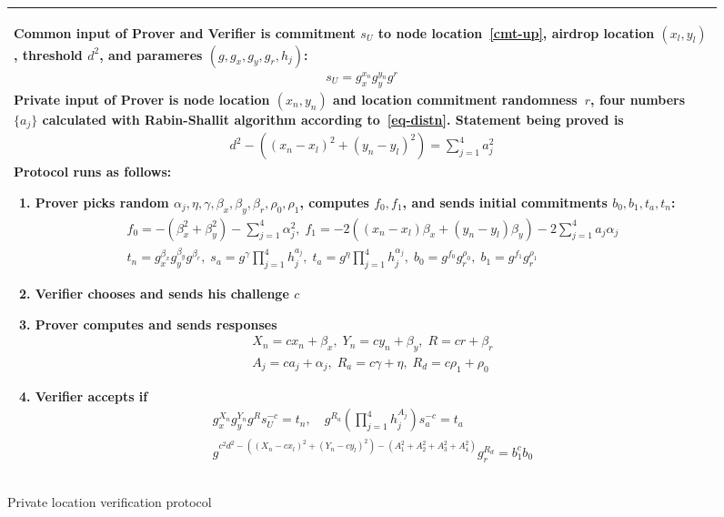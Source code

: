 \documentclass{article}
\begin{document}
\begin{figure}[!htb]
\begin{tabular}{|p{\linewidth}|}
\hline

Common input of Prover and Verifier is
  commitment $s_U$ to node location~\eqref{cmt-up},
  airdrop location $(x_l, y_l)$,
  threshold $d^2$,
  and parameres $(g, g_x, g_y, g_r, h_j)$:
\begin{gather}
\label{cmt-up}
  s_U = g_x^{x_n} g_y^{y_n} g^{r}
\end{gather}
Private input of Prover is
  node location $(x_n, y_n)$ and location commitment randomness~$r$,
  four numbers~$\{a_j\}$ calculated with Rabin-Shallit algorithm according to~\eqref{eq-distn}.
Statement being proved is
\begin{gather}
\label{eq-distn}
  d^2 - ((x_n - x_l)^2 + (y_n - y_l)^2) = \sum_{j=1}^4 a_j^2
\end{gather}
Protocol runs as follows:
\begin{enumerate}
\item
  Prover picks random $\alpha_j, \eta, \gamma, \beta_x, \beta_y, \beta_r, \rho_0, \rho_1$,
  computes $f_0, f_1$, and sends initial commitments $b_0, b_1, t_a, t_n$:
\begin{gather}
  f_0 = -(\beta_x^2 + \beta_y^2) - \sum_{j=1}^4 \alpha_j^2,   \;
  f_1 = -2( (x_n - x_l) \beta_x  + (y_n - y_l) \beta_y) -2 \sum_{j=1}^4 a_j \alpha_j   \\
%
  t_n = g_x^{\beta_x} g_y^{\beta_y} g^{\beta_r} ,   \;
  s_a = g^{\gamma} \prod_{j=1}^4 h_j^{a_j},   \;
  t_a = g^{\eta} \prod_{j=1}^4 h_j^{\alpha_j}, \;
  b_0 = g^{f_0} g_r^{\rho_0},  \;
  b_1 = g^{f_1} g_r^{\rho_1}
\end{gather}
%
\item
  Verifier chooses and sends his challenge $c$
\item
  Prover computes and sends responses
\begin{gather}
  X_n = c x_n + \beta_x,  \;
  Y_n = c y_n + \beta_y,  \;
  R = c r + \beta_r   \\
  A_j = c a_j + \alpha_j, \;
  R_a = c \gamma + \eta,   \;
  R_d = c \rho_1 + \rho_0
\end{gather}
%
\item
  Verifier accepts if
\begin{gather}
\label{verf-linear}
  g_x^{X_n} g_y^{Y_n} g^{R} s_U^{-c} = t_n, \quad
  g^{R_a} (\prod_{j=1}^4 h_j^{A_j}) s_a^{-c} = t_a \\
\label{verf-distn}
  g^{c^2 d^2 - ((X_n - c x_l)^2 + (Y_n - c y_l)^2) - (A_1^2 + A_2^2 + A_3^2 + A_4^2)} g_r^{R_d} = b_1^{c} b_0
\end{gather}
\end{enumerate}
\\
\hline
\end{tabular}
\caption{Private location verification protocol}
\label{fig}
\end{figure}
\end{document}
